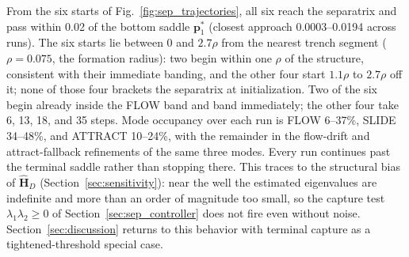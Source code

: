 \documentclass[lettersize,journal]{IEEEtran}
\begin{document}
From the six starts of Fig.~\ref{fig:sep_trajectories}, all six reach the
separatrix and pass within 0.02 of the bottom saddle
$\mathbf{p}^*_1$ (closest approach 0.0003--0.0194 across runs). The six
starts lie between $0$ and $2.7\rho$ from the nearest trench segment
($\rho = 0.075$, the formation radius): two begin within one $\rho$ of
the structure, consistent with their immediate banding, and the other
four start $1.1\rho$ to $2.7\rho$ off it; none of those four brackets
the separatrix at initialization. Two of
the six begin already inside the FLOW band and band immediately;
the other four take 6, 13, 18, and 35 steps. Mode occupancy over each run
is FLOW 6--37\%, SLIDE 34--48\%, and ATTRACT 10--24\%, with the
remainder in the flow-drift and attract-fallback refinements of the
same three modes. Every run continues past
the terminal saddle rather than stopping there. This traces to the
structural bias of $\hat{\mathbf{H}}_D$ (Section~\ref{sec:sensitivity}):
near the well the estimated eigenvalues are indefinite and more than an
order of magnitude too small, so the capture test
$\lambda_1\lambda_2 \geq 0$ of Section~\ref{sec:sep_controller} does not
fire even without noise. Section~\ref{sec:discussion} returns to this
behavior with terminal capture as a tightened-threshold special case.
\end{document}
